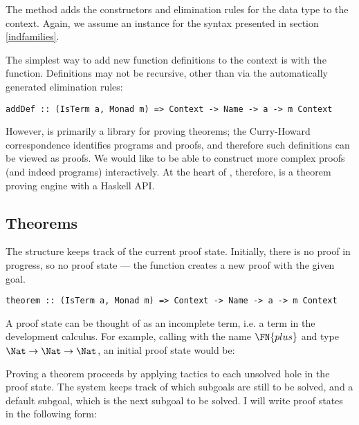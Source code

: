 The  method adds the constructors and elimination
rules for the data type to the context. Again, we assume an instance
for the syntax presented in section \ref{indfamilies}.

The simplest way to add new function definitions to the context is
with the  function. Definitions may not be recursive,
other than via the automatically generated elimination rules:

\begin{verbatim}
addDef :: (IsTerm a, Monad m) => Context -> Name -> a -> m Context
\end{verbatim}

However, \Ivor{} is primarily a library for proving theorems; the
Curry-Howard correspondence identifies programs and proofs, and
therefore such definitions can be viewed as proofs. We would like to
be able to construct more complex proofs (and indeed programs)
interactively. At the heart of \Ivor{}, therefore, is a theorem
proving engine with a Haskell API.

\subsection{Theorems}

The  structure keeps track of the current proof
state. Initially, there is no proof in progress, so no proof state ---
the  function creates a new proof with the given goal.

\begin{verbatim}
theorem :: (IsTerm a, Monad m) => Context -> Name -> a -> m Context
\end{verbatim}

A proof state can be thought of as an incomplete term, i.e. a
term in the development calculus. For example, calling 
with the name $\FN{plus}$ and type $\Nat\to\Nat\to\Nat$, an initial
proof state would be:


Proving a theorem proceeds by applying tactics to each unsolved hole
in the proof state. The system keeps track of which subgoals are still
to be solved, and a default subgoal, which is the next subgoal to be
solved. I will write proof states in the following form:


